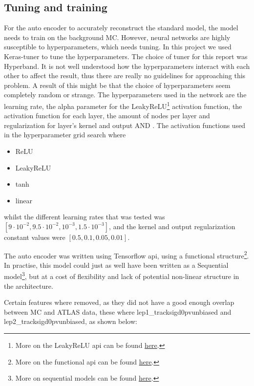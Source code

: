 \documentclass[ reprint, amsmath,amssymb, aps, nofootinbib]{revtex4-2}
\begin{document}
\subsection{Tuning and training}
For the auto encoder to accurately reconstruct the standard model, the model needs to train on the background MC. However, neural networks are highly susceptible to hyperparameters, which needs tuning. In this project we used Keras-tuner\cite{omalley2019kerastuner} to tune the hyperparameters. The choice of tuner for this report was Hyperband\cite{JMLR:v18:16-558}. It is not well understood how the hyperparameters interact with each other to affect the result, thus there are really no guidelines for approaching this problem. A result of this might be that the choice of hyperparameters seem completely random or strange. The hyperparameters used in the network are the learning rate, the alpha parameter for the LeakyReLU\footnote{More on the LeakyReLU api can be found \href{https://www.tensorflow.org/api_docs/python/tf/keras/layers/LeakyReLU}{here}.} activation function, the activation function for each layer, the amount of nodes per layer and regularization for layer's kernel and output AND . The activation functions used in the hyperparameter grid search where
\begin{itemize}
    \item ReLU
    \item LeakyReLU
    \item tanh
    \item linear
\end{itemize}
whilst the different learning rates that was tested was $[9\cdot 10^{-2}, 9.5\cdot 10^{-2}, 10^{-3}, 1.5\cdot 10^{-3}]$, and the kernel and output regularization constant values were $[0.5, 0.1, 0.05, 0.01]$.
\par 
The auto encoder was written using Tensorflow api\cite{tensorflow2015-whitepaper}\cite{chollet2015keras}, using a functional structure\footnote{More on the functional api can be found \href{https://www.tensorflow.org/guide/keras/functional}{here}.}. In practise, this model could just as well have been written as a Sequential model\footnote{More on sequential models can be found \href{https://www.tensorflow.org/guide/keras/sequential_model}{here}.}, but at a cost of flexibility and lack of potential non-linear structure in the architecture. \par 
Certain features where removed, as they did not have a good enough overlap between MC and ATLAS data, these where lep1\_tracksigd0pvunbiased and lep2\_tracksigd0pvunbiased, as shown below:
\end{document}
